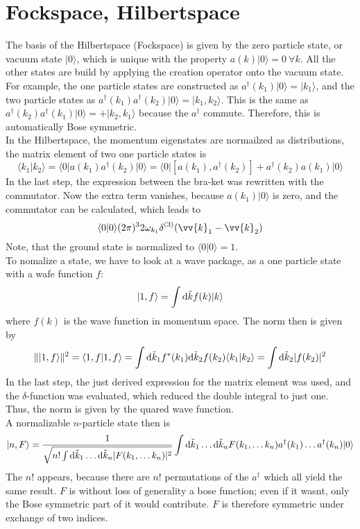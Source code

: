 \documentclass{include/thesisclass}
\newcommand{\rk}{\rangle}
\newcommand{\lk}{\langle}
\newcommand{\dd}{{\rm d}}
\begin{document}
\section{Fockspace, Hilbertspace}
The basis of the Hilbertspace (Fockspace) is given by the zero particle state, or vacuum state $|0\rk$, which is unique with the property $a(k)|0\rk = 0~\forall k$. All the other states are build by applying the creation operator onto the vacuum state.\\
For example, the one particle states are constructed as $a^\dagger(k_1)|0\rk = |k_1 \rk$, and the two particle states as $a^\dagger(k_1)a^\dagger(k_2)|0\rk = |k_1, k_2\rk$. This is the same as $a^\dagger(k_2)a^\dagger(k_1)|0\rk = + |k_2,k_1\rk$ because the $a^\dagger$ commute. Therefore, this is automatically Bose symmetric.\\
In the Hilbertspace, the momentum eigenstates are normailzed as distributions, the matrix element of two one particle states is
\[ \lk k_1 | k_2 \rk = \lk 0 | a(k_1)a^\dagger(k_2) | 0 \rk = \lk 0 | [ a(k_1), a^\dagger(k_2)] + a^\dagger(k_2) a(k_1)|0\rk\]
In the last step, the expression between the bra-ket was rewritten with the commutator. Now the extra term vanishes, because $a(k_1)|0\rk$ is zero, and the commutator can be calculated, which leads to
\[ \lk 0 | 0 \rk  (2\pi)^3 2 \omega_{k_1} \delta^{(3)}(\vv{k}_1 - \vv{k}_2)\]
Note, that the ground state is normalized to $\lk 0 | 0 \rk = 1$.\\
To nomalize a state, we have to look at a wave package, as a one particle state with a wafe function $f$:
\[ | 1 , f\rk = \int \dd \tilde{k} f(k) |k\rk\]
where $f(k)$ is the wave function in momentum space. The norm then is given by
\[ \| | 1, f\rk \|^2 = \lk 1, f| 1, f\rk = \int \dd\tilde{k}_1 f^*(k_1) \dd \tilde{k}_2 f(k_2) \lk k_1 |k_2\rk = \int \dd \tilde{k}_2 | f(k_2) |^2\]
In the last step, the just derived expression for the matrix element was used, and the $\delta$-function was evaluated, which reduced the double integral to just one. Thus, the norm is given by the quared wave function.\\
A normalizable $n$-particle state then is
\[ |n, F\rk = \frac{1}{\sqrt{ n! \int \dd \tilde{k}_1 \ldots \dd\tilde{k}_n | F(k_1, \ldots k_n) |^2}} \int \dd \tilde{k}_1 \ldots \dd \tilde{k}_n F(k_1, \ldots k_n) a^\dagger(k_1) \ldots a^\dagger(k_n) |0\rk\]
The $n!$ appears, because there are $n!$ permutations of the $a^\dagger$ which all yield the same result. $F$ is without loss of generality a bose function; even if it wasnt, only the Bose symmetric part of it would contribute. $F$ is therefore symmetric under exchange of two indices.\\
\end{document}
